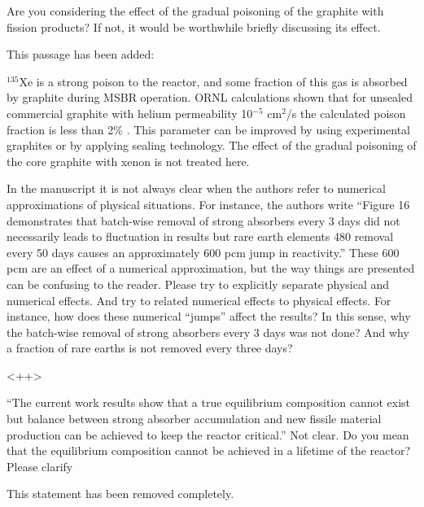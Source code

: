 \documentclass[answers,11pt]{exam}
\begin{document}
\begin{questions}

        \question Are you considering the effect of the gradual poisoning of 
        the graphite with fission products? If not, it would be worthwhile 
        briefly discussing its effect.
        \begin{solution}
                This passage has been added:
				
				$^{135}$Xe is a strong poison to the reactor, and some 
				fraction of this gas is absorbed by graphite during MSBR
				operation. ORNL calculations shown that for unsealed commercial 
				graphite with helium permeability 10$^{-5}$ cm$^2$/s the 
				calculated poison fraction is less than 2\% \cite{robertson_conceptual_1971}. 
				This parameter can be improved by using experimental graphites 
				or by applying sealing technology. The effect of the gradual 
				poisoning of the core graphite with xenon is not treated here.
        \end{solution}


        \question In the manuscript it is not always clear when the authors 
        refer to numerical approximations of physical situations. For instance, 
        the authors write ``Figure 16 demonstrates that batch-wise removal of 
        strong absorbers every 3 days did not necessarily leads to fluctuation 
        in results but rare earth elements 480 removal every 50 days causes an 
        approximately 600 pcm jump in reactivity.'' These 600 pcm are an effect 
        of a numerical approximation, but the way things are presented can be 
        confusing to the reader. Please try to explicitly separate physical and 
        numerical effects. And try to related numerical effects to physical 
        effects. For instance, how does these numerical ``jumps'' affect the 
        results?  In this sense, why the batch-wise removal of strong absorbers 
        every 3 days  was not done? And why a fraction of rare earths  is not 
        removed every three days?
        \begin{solution}
                <++>
        \end{solution}




        \question ``The current work results show that a true equilibrium 
        composition cannot exist but balance between strong absorber 
        accumulation and new fissile material production can be achieved to 
        keep the reactor critical.'' Not clear. Do you mean that the equilibrium 
        composition cannot be achieved in a lifetime of the reactor? Please 
        clarify
        \begin{solution}
                This statement has been removed completely.
        \end{solution}


\end{questions}
\end{document}
